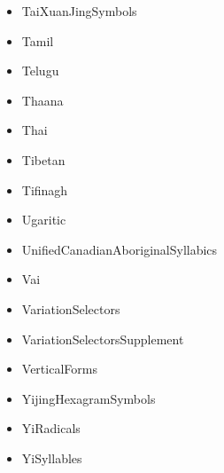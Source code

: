 \documentclass{article}
\newenvironment{itemlist}{%
  \begin{itemize}
	\setlength{\itemsep}{0pt}
	\setlength{\parsep}{0pt}
	\setlength{\topsep}{0pt}
	\setlength{\partopsep}{0pt}
	\setlength{\parskip}{0pt}
	\setlength{\labelsep}{5pt}}%
{
  \end{itemize}}
\begin{document}
\begin{multicols}{2}
\begin{itemlist}
				\item TaiXuanJingSymbols
				\item Tamil
				\item Telugu
				\item Thaana
				\item Thai
				\item Tibetan
				\item Tifinagh
				\item Ugaritic
				\item UnifiedCanadianAboriginalSyllabics
				\item Vai
				\item VariationSelectors
				\item VariationSelectorsSupplement
				\item VerticalForms
				\item YijingHexagramSymbols
				\item YiRadicals
				\item YiSyllables
			\end{itemlist}
		\end{multicols}
			
\end{document}
